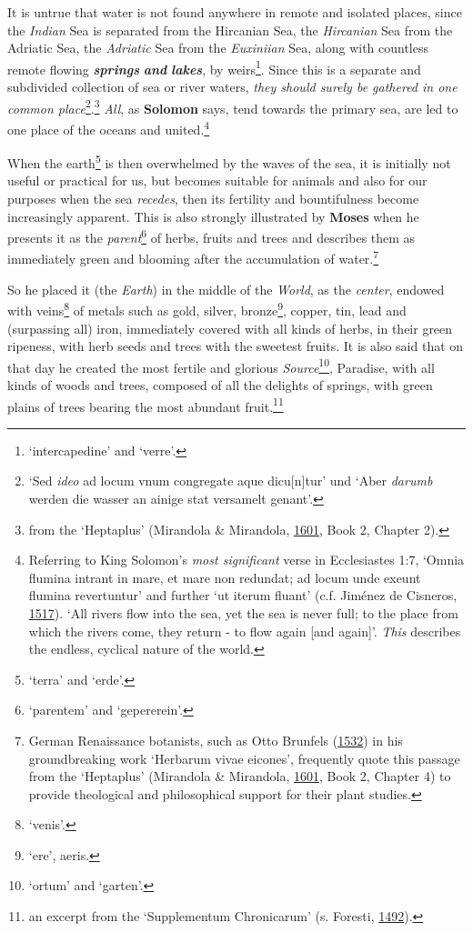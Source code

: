 \documentclass[
]{article}
\begin{document}
It is untrue that water is not found anywhere in remote and isolated
places, since the \emph{Indian} Sea is separated from the Hircanian Sea,
the \emph{Hircanian} Sea from the Adriatic Sea, the \emph{Adriatic} Sea
from the \emph{Euxiniian} Sea, along with countless remote flowing
\textbf{\emph{springs}} \textbf{\emph{and}} \textbf{\emph{lakes}}, by
weirs\footnote{`intercapedine' and `verre'.}. Since this is a separate
and subdivided collection of sea or river waters, \emph{they should
surely be gathered in one common place}\footnote{`Sed \emph{ideo} ad
  locum vnum congregate aque dicu{[}n{]}tur' und `Aber \emph{darumb}
  werden die wasser an ainige stat versamelt genant'.}.\footnote{from
  the `Heptaplus' (Mirandola \& Mirandola,
  \href{https://doi.org/10.3931/e-rara-61217}{1601}, Book 2, Chapter 2).}
\emph{All}, as \textbf{Solomon} says, tend towards the primary sea, are
led to one place of the oceans and united.\footnote{Referring to King
  Solomon's \emph{most significant} verse in Ecclesiastes 1:7, `Omnia
  flumina intrant in mare, et mare non redundat; ad locum unde exeunt
  flumina revertuntur' and further `ut iterum fluant' (c.f. Jiménez de
  Cisneros, \href{https://doi.org/10.3931/e-rara-46695}{1517}). `All
  rivers flow into the sea, yet the sea is never full; to the place from
  which the rivers come, they return - to flow again {[}and again{]}'.
  \emph{This} describes the endless, cyclical nature of the world.}

When the earth\footnote{`terra' and `erde'.} is then overwhelmed by the
waves of the sea, it is initially not useful or practical for us, but
becomes suitable for animals and also for our purposes when the sea
\emph{recedes}, then its fertility and bountifulness become increasingly
apparent. This is also strongly illustrated by \textbf{Moses} when he
presents it as the \emph{parent}\footnote{`parentem' and `gepererein'.}
of herbs, fruits and trees and describes them as immediately green and
blooming after the accumulation of water.\footnote{German Renaissance
  botanists, such as Otto Brunfels
  (\href{https://www.digitale-sammlungen.de/de/view/bsb11200240?page=1}{1532})
  in his groundbreaking work `Herbarum vivae eicones', frequently quote
  this passage from the `Heptaplus' (Mirandola \& Mirandola,
  \href{https://doi.org/10.3931/e-rara-61217}{1601}, Book 2, Chapter 4)
  to provide theological and philosophical support for their plant
  studies.}

So he placed it (the \emph{Earth}) in the middle of the \emph{World}, as
the \emph{center}, endowed with veins\footnote{`venis'.} of metals such
as gold, silver, bronze\footnote{`ere', aeris.}, copper, tin, lead and
(surpassing all) iron, immediately covered with all kinds of herbs, in
their green ripeness, with herb seeds and trees with the sweetest
fruits. It is also said that on that day he created the most fertile and
glorious \emph{Source}\footnote{`ortum' and `garten'.}, Paradise, with
all kinds of woods and trees, composed of all the delights of springs,
with green plains of trees bearing the most abundant fruit.\footnote{an
  excerpt from the `Supplementum Chronicarum' (s. Foresti,
  \href{https://books.google.com/books?id=ei9TruMbYCkC\&printsec=frontcover}{1492}).}
\end{document}
